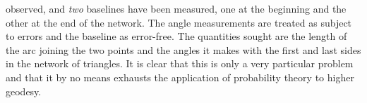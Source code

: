 observed, and \emph{two} baselines have been measured, one at the beginning and the other at the end of the network. The angle measurements are treated as subject to errors and the baseline as error-free. The quantities sought are the length of the arc joining the two points and the angles it makes with the first and last sides in the network of triangles. It is clear that this is only a very particular problem and that it by no means exhausts the application of probability theory to higher geodesy.
\par\clearpage\endgroup
